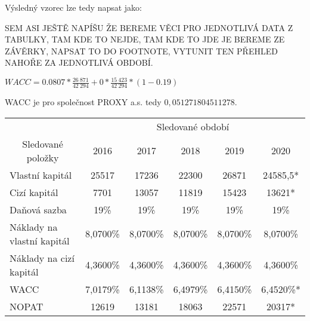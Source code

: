 Výsledný vzorec lze tedy napsat jako:

SEM ASI JEŠTĚ NAPÍŠU ŽE BEREME VĚCI PRO JEDNOTLIVÁ DATA Z TABULKY, TAM KDE TO NEJDE, TAM KDE TO JDE JE BEREME ZE ZÁVĚRKY, NAPSAT TO DO FOOTNOTE, VYTUNIT TEN PŘEHLED NAHOŘE ZA JEDNOTLIVÁ OBDOBÍ.

\begin{center}
$WACC = 0.0807 * \frac{26\ 871}{42\ 294} + 0 * \frac{15\ 423}{42\ 294} * (1 - 0.19)$	
\end{center}

WACC je pro společnost PROXY a.s. tedy $0,051271804511278$.

\begin{table}[]
\begin{tabular}{|l|ccccc|}
\hline
\multicolumn{1}{|c|}{} & \multicolumn{5}{c|}{Sledované období} \\ \cline{2-6} 
\multicolumn{1}{|c|}{\multirow{-2}{*}{Sledované položky}} & \multicolumn{1}{c|}{2016} & \multicolumn{1}{c|}{2017} & \multicolumn{1}{c|}{2018} & \multicolumn{1}{c|}{2019} & 2020 \\ \hline
Vlastní kapitál & \multicolumn{1}{c|}{25517} & \multicolumn{1}{c|}{17236} & \multicolumn{1}{c|}{22300} & \multicolumn{1}{c|}{26871} & 24585,5* \\ \hline
Cizí kapitál & \multicolumn{1}{c|}{7701} & \multicolumn{1}{c|}{13057} & \multicolumn{1}{c|}{11819} & \multicolumn{1}{c|}{15423} & 13621* \\ \hline
Daňová sazba & \multicolumn{1}{c|}{19\%} & \multicolumn{1}{c|}{19\%} & \multicolumn{1}{c|}{19\%} & \multicolumn{1}{c|}{19\%} & 19\% \\ \hline
\rowcolor[HTML]{C0C0C0} 
Náklady na vlastní kapitál & \multicolumn{1}{c|}{\cellcolor[HTML]{C0C0C0}8,0700\%} & \multicolumn{1}{c|}{\cellcolor[HTML]{C0C0C0}8,0700\%} & \multicolumn{1}{c|}{\cellcolor[HTML]{C0C0C0}8,0700\%} & \multicolumn{1}{c|}{\cellcolor[HTML]{C0C0C0}8,0700\%} & 8,0700\% \\ \hline
Náklady na cizí kapitál & \multicolumn{1}{c|}{4,3600\%} & \multicolumn{1}{c|}{4,3600\%} & \multicolumn{1}{c|}{4,3600\%} & \multicolumn{1}{c|}{4,3600\%} & 4,3600\% \\ \hline
\rowcolor[HTML]{C0C0C0} 
WACC & \multicolumn{1}{c|}{\cellcolor[HTML]{C0C0C0}7,0179\%} & \multicolumn{1}{c|}{\cellcolor[HTML]{C0C0C0}6,1138\%} & \multicolumn{1}{c|}{\cellcolor[HTML]{C0C0C0}6,4979\%} & \multicolumn{1}{c|}{\cellcolor[HTML]{C0C0C0}6,4150\%} & 6,4520\%* \\ \hline
NOPAT & \multicolumn{1}{c|}{12619} & \multicolumn{1}{c|}{13181} & \multicolumn{1}{c|}{18063} & \multicolumn{1}{c|}{22571} & 20317* \\ \hline

\end{tabular}
\end{table}
